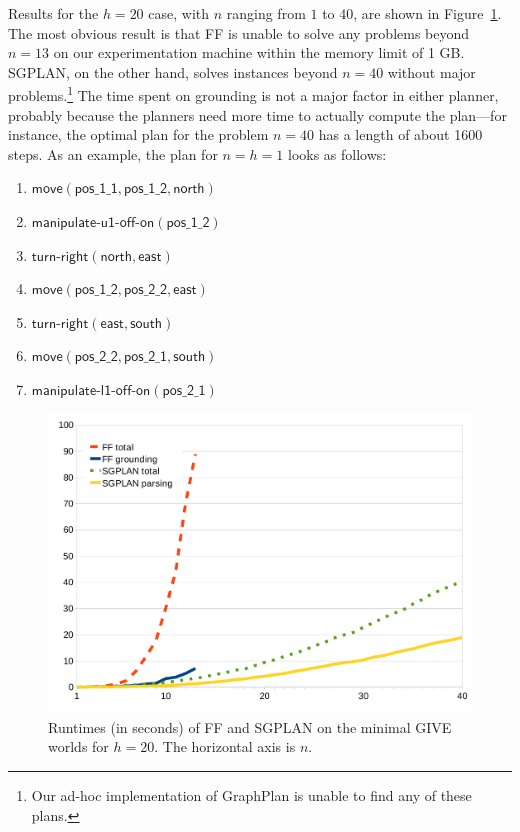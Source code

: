 Results for the $h=20$ case, with $n$ ranging from $1$ to $40$, are
shown in Figure~\ref{fig:give-runtime-minimal}.  The most obvious
result is that FF is unable to solve any problems beyond $n=13$ on our
experimentation machine within the memory limit of 1 GB.  SGPLAN, on
the other hand, solves instances beyond $n=40$ without major
problems.\footnote{Our ad-hoc implementation of GraphPlan is unable to
  find any of these plans.}  The time spent on grounding is not a
major factor in either planner, probably because the planners need
more time to actually compute the plan---for instance, the optimal
plan for the problem $n=40$ has a length of about 1600 steps.  As an
example, the plan for $n=h=1$ looks as follows:

\begin{enumerate}
\item $\mathsf{move}(\mathsf{pos\_1\_1},\mathsf{pos\_1\_2}, \mathsf{north})$
\item $\mathsf{manipulate}\textsf{-}\mathsf{u1}\textsf{-}\mathsf{off}\textsf{-}\mathsf{on}(\mathsf{pos\_1\_2})$
\item $\mathsf{turn}\textsf{-}\mathsf{right}(\mathsf{north}, \mathsf{east})$
\item $\mathsf{move}(\mathsf{pos\_1\_2}, \mathsf{pos\_2\_2},
  \mathsf{east})$
\item $\mathsf{turn}\textsf{-}\mathsf{right}(\mathsf{east}, \mathsf{south})$
\item $\mathsf{move}(\mathsf{pos\_2\_2}, \mathsf{pos\_2\_1}, \mathsf{south})$
\item $\mathsf{manipulate}\textsf{-}\mathsf{l1}\textsf{-}\mathsf{off}\textsf{-}\mathsf{on}(\mathsf{pos\_2\_1})$
\end{enumerate}




\begin{figure}
  \centering
  \includegraphics[width=1\columnwidth]{graph-exp2}
  \caption{Runtimes (in seconds) of FF and SGPLAN on the minimal GIVE
    worlds for $h=20$. The horizontal axis is $n$.}
  \label{fig:give-runtime-minimal}
\end{figure}


